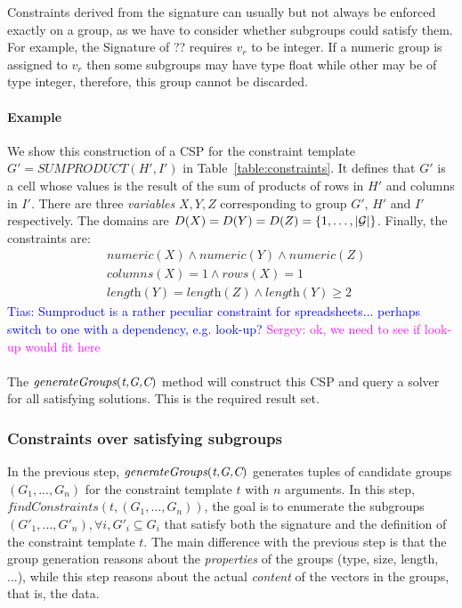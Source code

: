 \documentclass{sig-alternate-05-2015}
\newcommand{\sergey}[1]{\textcolor{magenta}{{\sc Sergey:} #1}\xspace}
\newcommand{\tias}[1]{\textcolor{blue}{{\sc Tias:} #1}\xspace}
\newcommand{\format}[1]{\textit{#1}\xspace}
\newcommand{\generategroups}{\format{generateGroups}}
\newcommand{\findassignment}{\format{findConstraints}}
\newcommand{\CSignature}{Signature\xspace}
\newcommand{\eccalc}[2]{\ensuremath{#1 = #2}}
\newcommand{\ecsumprod}[3]{\eccalc{#1}{\textit{SUMPRODUCT}(#2, #3)}}
\newcommand{\plength}{\format{length}}
\newcommand{\prows}{\format{rows}}
\newcommand{\pcols}{\format{columns}}
\begin{document}
Constraints derived from the signature can usually but not always be enforced exactly on a group, as we have to consider whether subgroups could satisfy them.
For example, the \CSignature of ?? requires $v_r$ to be integer.
If a numeric group is assigned to $v_r$ then some subgroups may have type float while other may be of type integer, therefore, this group cannot be discarded.


\paragraph{Example}
We show this construction of a CSP for the constraint template $\ecsumprod{G'}{H'}{I'}$ in Table~\ref{table:constraints}. It defines that $G'$ is a cell whose values is the result of the sum of products of rows in $H'$ and columns in $I'$.
%
There are three \textit{variables} $X, Y, Z$ corresponding to group $G'$, $H'$ and $I'$ respectively. The domains are $D(X) = D(Y) = D(Z) = \{1, \ldots, |{\cal G}|\}$. Finally, the constraints are:
\begin{align*}
&numeric(X) \land numeric(Y) \land numeric(Z) \\
&\pcols(X) = 1 \land \prows(X) = 1 \\
&\plength(Y) = \plength(Z) \land \plength(Y) \geq 2
\end{align*}
\tias{Sumproduct is a rather peculiar constraint for spreadsheets... perhaps switch to one with a dependency, e.g. look-up?}
\sergey{ok, we need to see if look-up would fit here}
\\\\


The $\generategroups(\textit{t,{\cal G},C})$ method will construct this CSP and query a solver for all satisfying solutions. This is the required result set.

\subsubsection{Constraints over satisfying subgroups} \label{sec:algo:subgr}
In the previous step, $\generategroups(\textit{t,{\cal G},C})$ generates tuples of candidate groups $(G_1, ..., G_n)$ for the constraint template $t$ with $n$ arguments. In this step, $\findassignment(t, (G_1, \dots, G_n))$, the goal is to enumerate the subgroups $(G'_1, ..., G'_n), \forall i, G'_i \subseteq G_i$ that satisfy both the signature and the definition of the constraint template $t$. The main difference with the previous step is that the group generation reasons about the \textit{properties} of the groups (type, size, length, ...), while this step reasons about the actual \textit{content} of the vectors in the groups, that is, the data.
\end{document}
